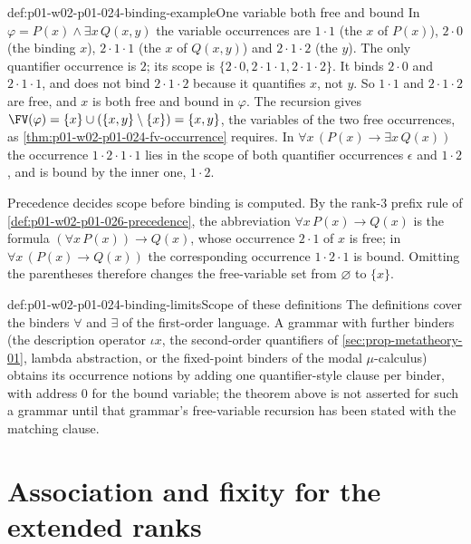 \begin{hbexample}{def:p01-w02-p01-024-binding-example}{One variable both free and bound}
In \(\varphi=P(x)\land\exists x\,Q(x,y)\) the variable occurrences are
\(1\cdot1\) (the \(x\) of \(P(x)\)), \(2\cdot0\) (the binding \(x\)),
\(2\cdot1\cdot1\) (the \(x\) of \(Q(x,y)\)) and \(2\cdot1\cdot2\) (the
\(y\)).  The only quantifier occurrence is \(2\); its scope is
\(\{2\cdot0,2\cdot1\cdot1,2\cdot1\cdot2\}\).  It binds \(2\cdot0\) and
\(2\cdot1\cdot1\), and does not bind \(2\cdot1\cdot2\) because it
quantifies \(x\), not \(y\).  So \(1\cdot1\) and \(2\cdot1\cdot2\) are free,
and \(x\) is both free and bound in \(\varphi\).  The recursion gives
\(\FV(\varphi)=\{x\}\cup(\{x,y\}\setminus\{x\})=\{x,y\}\), the variables of
the two free occurrences, as \cref{thm:p01-w02-p01-024-fv-occurrence}
requires.  In \(\forall x\,(P(x)\to\exists x\,Q(x))\) the occurrence
\(1\cdot2\cdot1\cdot1\) lies in the scope of both quantifier occurrences
\(\epsilon\) and \(1\cdot2\), and is bound by the inner one,
\(1\cdot2\).
\end{hbexample}

Precedence decides scope before binding is computed.  By the rank-3 prefix
rule of \cref{def:p01-w02-p01-026-precedence}, the abbreviation
\(\forall x\,P(x)\to Q(x)\) is the formula
\((\forall x\,P(x))\to Q(x)\), whose occurrence \(2\cdot1\) of \(x\) is
free; in \(\forall x\,(P(x)\to Q(x))\) the corresponding occurrence
\(1\cdot2\cdot1\) is bound.  Omitting the parentheses therefore changes the
free-variable set from \(\varnothing\) to \(\{x\}\).

\begin{hbwarning}{def:p01-w02-p01-024-binding-limits}{Scope of these definitions}
The definitions cover the binders \(\forall\) and \(\exists\) of the
first-order language.  A grammar with further binders (the description
operator \(\iota x\), the second-order quantifiers of
\cref{sec:prop-metatheory-01}, lambda abstraction, or the fixed-point
binders of the modal \(\mu\)-calculus) obtains its occurrence notions by
adding one quantifier-style clause per binder, with address \(0\) for the
bound variable; the theorem above is not asserted for such a grammar until
that grammar's free-variable recursion has been stated with the matching
clause.
\end{hbwarning}

\section{Association and fixity for the extended ranks}
\label{sec:p01-w02-p01-024-precedence}

